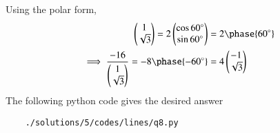 Using the polar form,
	\begin{align}
{\myvec{1\\\sqrt{3}}} = 2 \myvec{\cos 60\degree \\ \sin 60 \degree} &=2 \phase{60\degree}
\\
\implies 		\frac{-16}{\myvec{1\\\sqrt{3}}} = -8\phase{-60\degree} &= 4\myvec{-1 \\ \sqrt{3}}
	\end{align}
The following python code gives the desired answer
	\begin{lstlisting}
	./solutions/5/codes/lines/q8.py
	\end{lstlisting}
